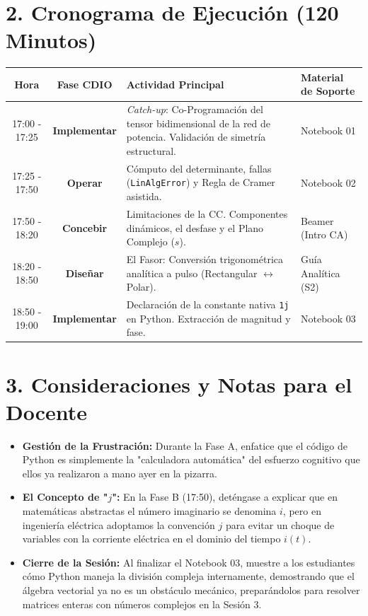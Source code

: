 \documentclass[11pt,a4paper]{article}
\begin{document}
\section*{2. Cronograma de Ejecución (120 Minutos)}
\begin{table}[h!]
    \centering
    \renewcommand{\arraystretch}{1.3}
    \begin{tabularx}{\textwidth}{@{} c c X l @{}}
        \toprule
        \textbf{Hora} & \textbf{Fase CDIO} & \textbf{Actividad Principal} & \textbf{Material de Soporte} \\
        \midrule
        17:00 - 17:25 & \textbf{Implementar} & \textit{Catch-up}: Co-Programación del tensor bidimensional de la red de potencia. Validación de simetría estructural. & Notebook 01 \\
        17:25 - 17:50 & \textbf{Operar} & Cómputo del determinante, fallas (\texttt{LinAlgError}) y Regla de Cramer asistida. & Notebook 02 \\
        \midrule
        17:50 - 18:20 & \textbf{Concebir} & Limitaciones de la CC. Componentes dinámicos, el desfase y el Plano Complejo ($s$). & Beamer (Intro CA) \\
        18:20 - 18:50 & \textbf{Diseñar} & El Fasor: Conversión trigonométrica analítica a pulso (Rectangular $\leftrightarrow$ Polar). & Guía Analítica (S2) \\
        18:50 - 19:00 & \textbf{Implementar} & Declaración de la constante nativa \texttt{1j} en Python. Extracción de magnitud y fase. & Notebook 03 \\
        \bottomrule
    \end{tabularx}
\end{table}

\section*{3. Consideraciones y Notas para el Docente}
\begin{itemize}
    \item \textbf{Gestión de la Frustración:} Durante la Fase A, enfatice que el código de Python es simplemente la "calculadora automática" del esfuerzo cognitivo que ellos ya realizaron a mano ayer en la pizarra.
    \item \textbf{El Concepto de "$j$":} En la Fase B (17:50), deténgase a explicar que en matemáticas abstractas el número imaginario se denomina $i$, pero en ingeniería eléctrica adoptamos la convención $j$ para evitar un choque de variables con la corriente eléctrica en el dominio del tiempo $i(t)$.
    \item \textbf{Cierre de la Sesión:} Al finalizar el Notebook 03, muestre a los estudiantes cómo Python maneja la división compleja internamente, demostrando que el álgebra vectorial ya no es un obstáculo mecánico, preparándolos para resolver matrices enteras con números complejos en la Sesión 3.
\end{itemize}
\end{document}
